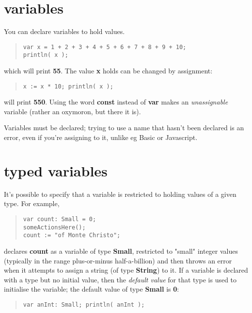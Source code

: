 \documentclass{report}
\begin{document}
\section{variables}


You can declare variables to hold values.

\begin{quote}
\begin{verbatim}
var x = 1 + 2 + 3 + 4 + 5 + 6 + 7 + 8 + 9 + 10;
println( x );
\end{verbatim}
\end{quote}


which will print {\bf 55}. The value {\bf x} holds can be changed
by assignment:

\begin{quote}
\begin{verbatim}
x := x * 10; println( x );
\end{verbatim}
\end{quote}


will print {\bf 550}. Using the word {\bf const} instead of {\bf var}
makes an {\em unassignable} variable (rather an oxymoron, but there it is).

Variables must be declared; trying to use a name that hasn't been declared is
an error, even if you're assigning to it, unlike eg Basic or Javascript.

\section{typed variables}


It's possible to specify that a variable is restricted to holding values of a
given type. For example,

\begin{quote}
\begin{verbatim}
var count: Small = 0;
someActionsHere();
count := "of Monte Christo";
\end{verbatim}
\end{quote}


declares {\bf count} as a variable of type {\bf Small}, restricted to "small" integer
values (typically in the range plus-or-minus half-a-billion) and then throws
an error when it attempts to assign a string (of type {\bf String}) to it. If a
variable is declared with a type but no initial value, then the {\em default
value} for that type is used to initialise the variable; the default value of
type {\bf Small} is {\bf 0}:

\begin{quote}
\begin{verbatim}
var anInt: Small; println( anInt );
\end{verbatim}
\end{quote}
\end{document}
